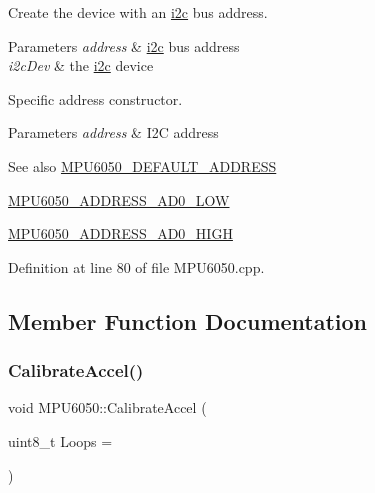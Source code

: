 Create the device with an \mbox{\hyperlink{namespacei2c}{i2c}} bus address.


\begin{DoxyParams}{Parameters}
{\em address} & \mbox{\hyperlink{namespacei2c}{i2c}} bus address \\
\hline
{\em i2c\+Dev} & the \mbox{\hyperlink{namespacei2c}{i2c}} device\\
\hline
\end{DoxyParams}
Specific address constructor. 
\begin{DoxyParams}{Parameters}
{\em address} & I2C address \\
\hline
\end{DoxyParams}
\begin{DoxySeeAlso}{See also}
\mbox{\hyperlink{MPU6050_8h_ae5cf60bf2cbc13d21384c215c4f05149}{M\+P\+U6050\+\_\+\+D\+E\+F\+A\+U\+L\+T\+\_\+\+A\+D\+D\+R\+E\+SS}} 

\mbox{\hyperlink{MPU6050_8h_ad9c8593ecb6f9a2865b8080add402cc6}{M\+P\+U6050\+\_\+\+A\+D\+D\+R\+E\+S\+S\+\_\+\+A\+D0\+\_\+\+L\+OW}} 

\mbox{\hyperlink{MPU6050_8h_ad6e414ff4b69bb789ac93215a28c8d9c}{M\+P\+U6050\+\_\+\+A\+D\+D\+R\+E\+S\+S\+\_\+\+A\+D0\+\_\+\+H\+I\+GH}} 
\end{DoxySeeAlso}


Definition at line 80 of file M\+P\+U6050.\+cpp.


\begin{DoxyCode}{0}

\end{DoxyCode}


\subsection{Member Function Documentation}
\mbox{\label{classMPU6050_a921f5d34643655bf3a584dd52615a526}} 
\subsubsection{\texorpdfstring{CalibrateAccel()}{CalibrateAccel()}}
{\footnotesize\ttfamily void M\+P\+U6050\+::\+Calibrate\+Accel (\begin{DoxyParamCaption}\item[{uint8\+\_\+t}]{Loops = {} }\end{DoxyParamCaption})}



